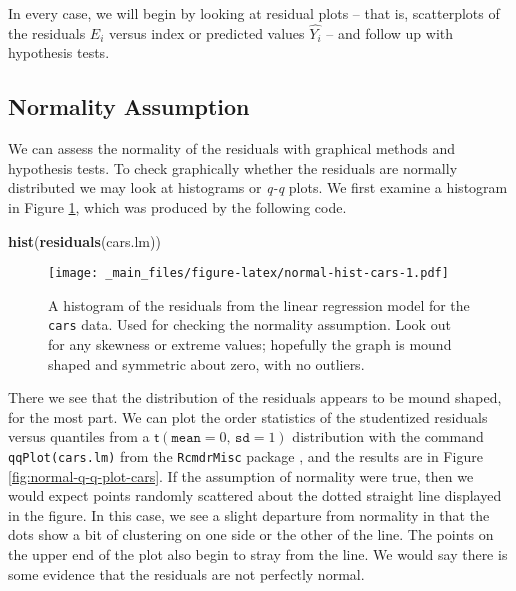 \documentclass[]{book}
\newenvironment{Shaded}{\begin{snugshade}}{\end{snugshade}}
\newcommand{\KeywordTok}[1]{\textcolor[rgb]{0.13,0.29,0.53}{\textbf{{#1}}}}
\newcommand{\NormalTok}[1]{{#1}}
\numberwithin{equation}{chapter}
\numberwithin{figure}{chapter}
\theoremstyle{plain}
\theoremstyle{definition}
\theoremstyle{remark}
\theoremstyle{definition}
\theoremstyle{definition}
\theoremstyle{remark}
\begin{document}
In every case, we will begin by looking at residual plots -- that is,
scatterplots of the residuals \(E_{i}\) versus index or predicted values
\(\hat{Y_{i}}\) -- and follow up with hypothesis tests.

\subsection{Normality Assumption}\label{sub-normality-assumption}

We can assess the normality of the residuals with graphical methods and
hypothesis tests. To check graphically whether the residuals are
normally distributed we may look at histograms or \emph{q-q} plots. We
first examine a histogram in Figure \ref{fig:normal-hist-cars}, which
was produced by the following code.

\begin{Shaded}
\begin{Highlighting}[]
\KeywordTok{hist}\NormalTok{(}\KeywordTok{residuals}\NormalTok{(cars.lm))}
\end{Highlighting}
\end{Shaded}

\begin{figure}[htbp]
\centering
\texttt{[image: \_main\_files/figure-latex/normal-hist-cars-1.pdf]}
\caption{\label{fig:normal-hist-cars}\small A histogram of the residuals from the
linear regression model for the \texttt{cars} data. Used for checking
the normality assumption. Look out for any skewness or extreme values;
hopefully the graph is mound shaped and symmetric about zero, with no
outliers.}
\end{figure}







There we see that the distribution of the residuals appears to be mound
shaped, for the most part. We can plot the order statistics of the
studentized residuals versus quantiles from a
\(\mathsf{t}(\mathtt{mean}=0,\,\mathtt{sd}=1)\) distribution with the
command \texttt{qqPlot(cars.lm)} from the \texttt{RcmdrMisc} package
\autocite{RcmdrMisc}, and the results are in Figure
\ref{fig:normal-q-q-plot-cars}. If the assumption of normality were
true, then we would expect points randomly scattered about the dotted
straight line displayed in the figure. In this case, we see a slight
departure from normality in that the dots show a bit of clustering on
one side or the other of the line. The points on the upper end of the
plot also begin to stray from the line. We would say there is some
evidence that the residuals are not perfectly normal.
\end{document}
